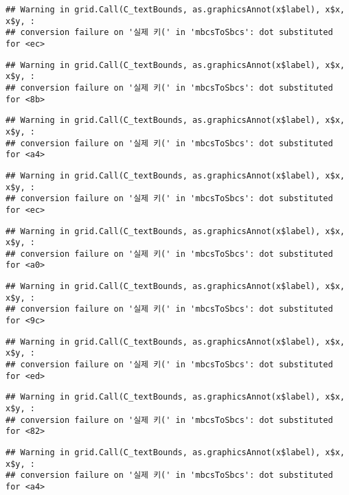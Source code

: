 \documentclass[]{book}
\begin{document}
\begin{verbatim}
## Warning in grid.Call(C_textBounds, as.graphicsAnnot(x$label), x$x, x$y, :
## conversion failure on '실제 키(' in 'mbcsToSbcs': dot substituted for <ec>
\end{verbatim}

\begin{verbatim}
## Warning in grid.Call(C_textBounds, as.graphicsAnnot(x$label), x$x, x$y, :
## conversion failure on '실제 키(' in 'mbcsToSbcs': dot substituted for <8b>
\end{verbatim}

\begin{verbatim}
## Warning in grid.Call(C_textBounds, as.graphicsAnnot(x$label), x$x, x$y, :
## conversion failure on '실제 키(' in 'mbcsToSbcs': dot substituted for <a4>
\end{verbatim}

\begin{verbatim}
## Warning in grid.Call(C_textBounds, as.graphicsAnnot(x$label), x$x, x$y, :
## conversion failure on '실제 키(' in 'mbcsToSbcs': dot substituted for <ec>
\end{verbatim}

\begin{verbatim}
## Warning in grid.Call(C_textBounds, as.graphicsAnnot(x$label), x$x, x$y, :
## conversion failure on '실제 키(' in 'mbcsToSbcs': dot substituted for <a0>
\end{verbatim}

\begin{verbatim}
## Warning in grid.Call(C_textBounds, as.graphicsAnnot(x$label), x$x, x$y, :
## conversion failure on '실제 키(' in 'mbcsToSbcs': dot substituted for <9c>
\end{verbatim}

\begin{verbatim}
## Warning in grid.Call(C_textBounds, as.graphicsAnnot(x$label), x$x, x$y, :
## conversion failure on '실제 키(' in 'mbcsToSbcs': dot substituted for <ed>
\end{verbatim}

\begin{verbatim}
## Warning in grid.Call(C_textBounds, as.graphicsAnnot(x$label), x$x, x$y, :
## conversion failure on '실제 키(' in 'mbcsToSbcs': dot substituted for <82>
\end{verbatim}

\begin{verbatim}
## Warning in grid.Call(C_textBounds, as.graphicsAnnot(x$label), x$x, x$y, :
## conversion failure on '실제 키(' in 'mbcsToSbcs': dot substituted for <a4>
\end{verbatim}
\end{document}
